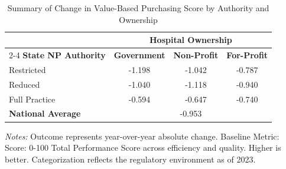 \begin{table}[htbp]
    \centering
    \caption{Summary of Change in Value-Based Purchasing Score by Authority and Ownership}
    \label{tab:d_hvbp_tps_score_own}
    \vspace{0.2cm}
    \begin{tabular}{lccc}
        \toprule
        & \multicolumn{3}{c}{\textbf{Hospital Ownership}} \\
        \cmidrule(lr){2-4}
        \textbf{State NP Authority} & \textbf{Government} & \textbf{Non-Profit} & \textbf{For-Profit} \\
        \midrule
        Restricted & -1.198 & -1.042 & -0.787 \\
        Reduced & -1.040 & -1.118 & -0.940 \\
        Full Practice & -0.594 & -0.647 & -0.740 \\
        \midrule
        \textbf{National Average} & \multicolumn{3}{c}{-0.953} \\
        \bottomrule
    \end{tabular}
    \vspace{0.1cm}
    \begin{minipage}{0.85\textwidth}
        \footnotesize \textit{Notes:} Outcome represents year-over-year absolute change. Baseline Metric: Score: 0-100 Total Performance Score across efficiency and quality. Higher is better. Categorization reflects the regulatory environment as of 2023.
    \end{minipage}
\end{table}